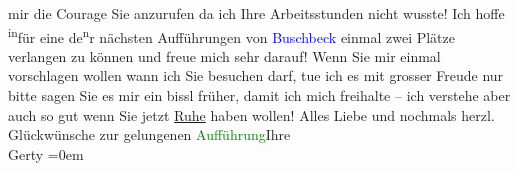                mir die Courage Sie anzurufen da ich Ihre Arbeitsstunden nicht wusste!\pend
           \pstart
           Ich hoffe \substVorne{}\textsuperscript{in}\substDazwischen{}für eine\substHinten{} de\substVorne{}\textsuperscript{n}\substDazwischen{}r\substHinten{} nächsten Aufführungen von \textcolor{blue}{Buschbeck}{}\ledrightnote{\textcolor{blue}{Erhard Buschbeck}}
               einmal zwei Plätze verlangen zu können und freue mich sehr darauf!\pend
           \pstart
           Wenn Sie mir einmal vorschlagen wollen wann ich Sie besuchen darf, tue ich es mit
               grosser Freude nur bitte sagen Sie es mir ein bissl früher, damit ich mich freihalte
               – ich verstehe aber auch so gut wenn Sie jetzt \uline{Ruhe}
               haben wollen!\pend
           \pstart
           Alles Liebe und nochmals herzl. Glückwünsche zur gelungenen \textcolor{green}{Aufführung}{}Ihre{\\[\baselineskip]}\spacefill\mbox{Gerty}\pend
           \leftskip=0em{}\endnumbering{}  
      